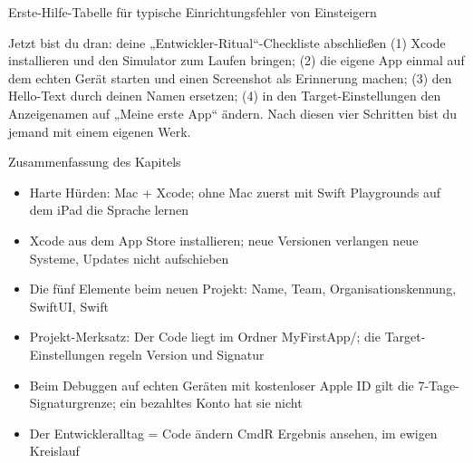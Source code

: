 \begin{center}\small\color{gray}Erste-Hilfe-Tabelle für typische Einrichtungsfehler von Einsteigern\end{center}

\begin{tcbpractice}{Jetzt bist du dran: deine „Entwickler-Ritual“-Checkliste abschließen}
(1) Xcode installieren und den Simulator zum Laufen bringen; (2) die eigene App einmal auf dem echten Gerät starten und einen Screenshot als Erinnerung machen; (3) den Hello-Text durch deinen Namen ersetzen; (4) in den Target-Einstellungen den Anzeigenamen auf „Meine erste App“ ändern. Nach diesen vier Schritten bist du jemand mit einem eigenen Werk.

\end{tcbpractice}

\begin{tcbsummary}{Zusammenfassung des Kapitels}
\begin{itemize}
  \item Harte Hürden: Mac + Xcode; ohne Mac zuerst mit Swift Playgrounds auf dem iPad die Sprache lernen
  \item Xcode aus dem App Store installieren; neue Versionen verlangen neue Systeme, Updates nicht aufschieben
  \item Die fünf Elemente beim neuen Projekt: Name, Team, Organisationskennung, SwiftUI, Swift
  \item Projekt-Merksatz: Der Code liegt im Ordner MyFirstApp/; die Target-Einstellungen regeln Version und Signatur
  \item Beim Debuggen auf echten Geräten mit kostenloser Apple ID gilt die 7-Tage-Signaturgrenze; ein bezahltes Konto hat sie nicht
  \item Der Entwickleralltag = Code ändern CmdR Ergebnis ansehen, im ewigen Kreislauf
\end{itemize}

\end{tcbsummary}
